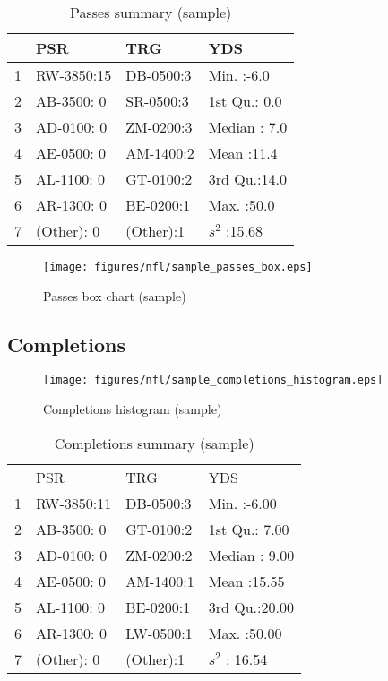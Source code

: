 \documentclass{exam}
\begin{document}
  \begin{table}[H]
    \centering
    \begin{tabular}{rlll}
      \toprule
        & PSR        & TRG       & YDS \\
      \midrule
      1 & RW-3850:15 & DB-0500:3 & Min.   :-6.0   \\
      2 & AB-3500: 0 & SR-0500:3 & 1st Qu.: 0.0   \\
      3 & AD-0100: 0 & ZM-0200:3 & Median : 7.0   \\
      4 & AE-0500: 0 & AM-1400:2 & Mean   :11.4   \\
      5 & AL-1100: 0 & GT-0100:2 & 3rd Qu.:14.0   \\
      6 & AR-1300: 0 & BE-0200:1 & Max.   :50.0   \\
      7 & (Other): 0 & (Other):1 & $s^2$  :15.68 \\
      \bottomrule
    \end{tabular}
    \caption{Passes summary (sample)}
  \end{table}

  \begin{figure}[H]
    \centering
    \texttt{[image: figures/nfl/sample\_passes\_box.eps]}
    \caption{Passes box chart (sample)}
  \end{figure}

  \subsection{Completions}

  \begin{figure}[H]
    \centering
    \texttt{[image: figures/nfl/sample\_completions\_histogram.eps]}
    \caption{Completions histogram (sample)}
  \end{figure}

  \begin{table}[H]
    \centering
    \begin{tabular}{rlll}
      \toprule
      \midrule
         & PSR        & TRG       & YDS \\
      1  & RW-3850:11 & DB-0500:3 & Min.   :-6.00   \\
      2  & AB-3500: 0 & GT-0100:2 & 1st Qu.: 7.00   \\
      3  & AD-0100: 0 & ZM-0200:2 & Median : 9.00   \\
      4  & AE-0500: 0 & AM-1400:1 & Mean   :15.55   \\
      5  & AL-1100: 0 & BE-0200:1 & 3rd Qu.:20.00   \\
      6  & AR-1300: 0 & LW-0500:1 & Max.   :50.00   \\
      7  & (Other): 0 & (Other):1 & $s^2$  : 16.54 \\
      \bottomrule
    \end{tabular}
    \caption{Completions summary (sample)}
  \end{table}
\end{document}
